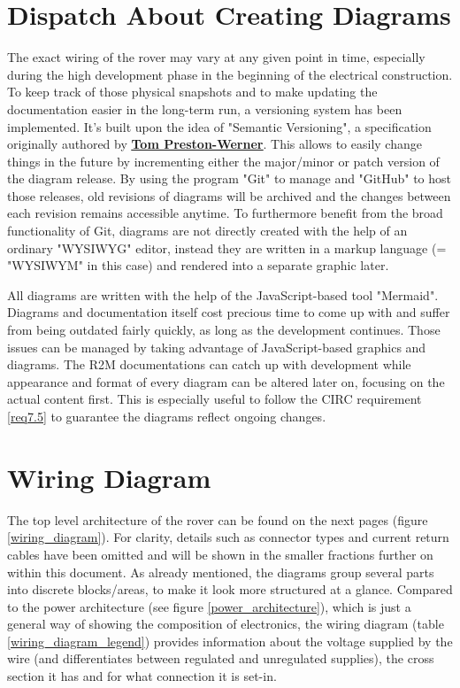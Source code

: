 \section{Dispatch About Creating Diagrams}

    The exact wiring of the rover may vary at any given point in time, especially during the high development phase in the beginning of the electrical construction. To keep track of those physical snapshots and to make updating the documentation easier in the long-term run, a versioning system has been implemented. It's built upon the idea of "Semantic Versioning", a specification originally authored by \href{https://tom.preston-werner.com/}{\textbf{\underline{Tom Preston-Werner}}}. This allows to easily change things in the future by incrementing either the major/minor or patch version of the diagram release. By using the program "Git" to manage and "GitHub" to host those releases, old revisions of diagrams will be archived and the changes between each revision remains accessible anytime. To furthermore benefit from the broad functionality of Git, diagrams are not directly created with the help of an ordinary "WYSIWYG" editor, instead they are written in a markup language (= "WYSIWYM" in this case) and rendered into a separate graphic later. 

    \vspace{5mm} %

    All diagrams are written with the help of the JavaScript-based tool "Mermaid". Diagrams and documentation itself cost precious time to come up with and suffer from being outdated fairly quickly, as long as the development continues. Those issues can be managed by taking advantage of JavaScript-based graphics and diagrams. The R2M documentations can catch up with development while appearance and format of every diagram can be altered later on, focusing on the actual content first. This is especially useful to follow the CIRC requirement \ref{req7.5} to guarantee the diagrams reflect ongoing changes.

    \clearpage %

\section{Wiring Diagram}

    The top level architecture of the rover can be found on the next pages (figure \ref{wiring_diagram}). For clarity, details such as connector types and current return cables have been omitted and will be shown in the smaller fractions further on within this document. As already mentioned, the diagrams group several parts into discrete blocks/areas, to make it look more structured at a glance. Compared to the power architecture (see figure \ref{power_architecture}), which is just a general way of showing the composition of electronics, the wiring diagram (table \ref{wiring_diagram_legend}) provides information about the voltage supplied by the wire (and differentiates between regulated and unregulated supplies), the cross section it has and for what connection it is set-in. 

